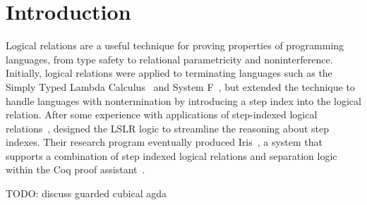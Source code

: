 \documentclass[acmsmall]{acmart}
\begin{document}



\maketitle


\clearpage

\tableofcontents

\section{Introduction}

Logical relations are a useful technique for proving properties of
programming languages, from type safety to relational parametricity
and noninterference.  Initially, logical relations were applied to
terminating languages such as the Simply Typed Lambda
Calculus~\citep{Tait:1967aa} and System F~\citep{GIRARD72}, but
\citet{Appel:2001aa} extended the technique to handle languages with
nontermination by introducing a step index into the logical
relation. After some experience with applications of step-indexed
logical
relations~\citep{Ahmed:2004eu,Ahmed:2009aa,Neis:2009fk,Hur:2011aa},
\citet{Dreyer:2011wl} designed the LSLR logic to streamline the
reasoning about step indexes. Their research program eventually
produced Iris~\citep{JUNG:2018aa}, a system that supports a
combination of step indexed logical relations and separation logic
within the Coq proof
assistant~\citep{The-Coq-Development-Team:2004kf,Huet:2016aa}.

TODO: discuss guarded cubical agda
\end{document}
